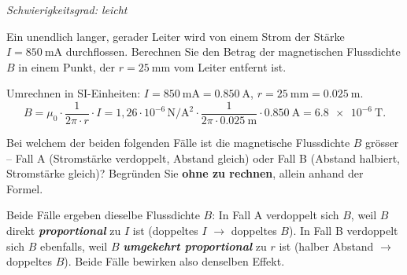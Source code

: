 \documentclass[addpoints,11pt,a4paper]{exam}
\newlength{\antwortraumlen}
\newcommand{\Antwortraum}[1]{%
  \pgfmathsetlength{\antwortraumlen}{#1*2.5cm}%
  \begin{answerbox}
    \rule{0pt}{\antwortraumlen}%
  \end{answerbox}%
}
\newcommand{\Schwierigkeit}[1]{%
  \textit{\color{darkgray}Schwierigkeitsgrad: #1}\par\smallskip
}
\begin{document}
\begin{questions}
\begin{taskbox}
\Schwierigkeit{leicht}
\question[2] Ein unendlich langer, gerader Leiter wird von einem Strom der
Stärke $I=\SI{850}{\milli\ampere}$ durchflossen. Berechnen Sie den Betrag
der magnetischen Flussdichte $B$ in einem Punkt, der $r=\SI{25}{\milli\meter}$
vom Leiter entfernt ist.
\Antwortraum{2}
\begin{solution}
Umrechnen in SI-Einheiten: $I=\SI{850}{\milli\ampere}=\SI{0.850}{\ampere}$,
$r=\SI{25}{\milli\meter}=\SI{0.025}{\meter}$.
\[
  B = \mu_0\cdot\frac{1}{2\pi\cdot r}\cdot I
    = 1{,}26\cdot10^{-6}\,\si{\newton\per\ampere\squared}\cdot\frac{1}{2\pi\cdot\SI{0.025}{\meter}}\cdot\SI{0.850}{\ampere}
    = \SI{6.8e-6}{\tesla}.
\]
\end{solution}

\question[2] Bei welchem der beiden folgenden Fälle ist die magnetische
Flussdichte $B$ grösser -- Fall A (Stromstärke verdoppelt, Abstand
gleich) oder Fall B (Abstand halbiert, Stromstärke gleich)? Begründen Sie
\textbf{ohne zu rechnen}, allein anhand der Formel.
\Antwortraum{2}
\begin{solution}
Beide Fälle ergeben dieselbe Flussdichte $B$: In Fall A verdoppelt sich
$B$, weil $B$ direkt \textbf{\emph{proportional}} zu $I$ ist (doppeltes
$I$ $\to$ doppeltes $B$). In Fall B verdoppelt sich $B$ ebenfalls, weil
$B$ \textbf{\emph{umgekehrt proportional}} zu $r$ ist (halber Abstand
$\to$ doppeltes $B$). Beide Fälle bewirken also denselben Effekt.
\end{solution}
\end{taskbox}
\end{questions}
\end{document}
